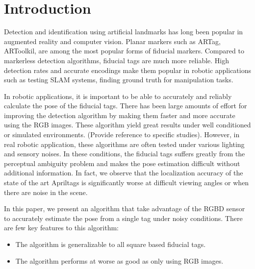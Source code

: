 \section{Introduction}
\label{sec:intro}
Detection and identification using artificial landmarks has long been popular in augmented reality and computer vision. Planar markers such as ARTag, ARToolkil, are among the most popular forms of fiducial markers. Compared to markerless detection algorithms, fiducial tags are much more reliable. High detection rates and accurate encodings make them popular in robotic applications such as testing SLAM systems, finding ground truth for manipulation tasks.    

In robotic applications, it is important to be able to accurately and reliably calculate the pose of the fiducial tags. There has been large amounts of effort for improving the detection algorithm by making them faster and more accurate using the RGB images. These algorithm yield great results under well conditioned or simulated environments. (Provide reference to specific studies). However, in real robotic application, these algorithms are often tested under various lighting and sensory noises. In these conditions, the fiducial tags suffers greatly from the perceptual ambiguity problem and makes the pose estimation difficult without additional information. In fact, we observe that the localization accuracy of the state of the art Apriltags is significantly worse at difficult viewing angles or when there are noise in the scene. 

In this paper, we present an algorithm that take advantage of the RGBD sensor to accurately estimate the pose from a single tag under noisy conditions. There are few key features to this algorithm: 
\begin{itemize}
\item The algorithm is generalizable to all square based fiducial tags.
\item The algorithm performs at worse as good as only using RGB images.
\end{itemize}